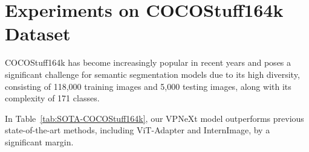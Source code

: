 

\section{Experiments on COCOStuff164k Dataset}

COCOStuff164k has become increasingly popular in recent years and poses a significant challenge for semantic segmentation models due to its high diversity, consisting of 118,000 training images and 5,000 testing images, along with its complexity of 171 classes.

In Table~\ref{tab:SOTA-COCOStuff164k}, our VPNeXt model outperforms previous state-of-the-art methods, including ViT-Adapter and InternImage, by a significant margin.

